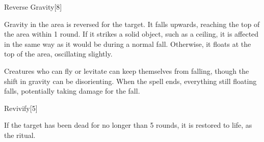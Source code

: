 \begin{spellsection}{Reverse Gravity}[8]
    \begin{spellheader}
    \end{spellheader}
    \begin{spellcontent}
        \begin{spelltargetinginfo}
        \end{spelltargetinginfo}
        \begin{spelleffects}
            \spelleffect Gravity in the area is reversed for the target. It falls upwards, reaching the top of the area within 1 round. If it strikes a solid object, such as a ceiling, it is affected in the same way as it would be during a normal fall. Otherwise, it floats at the top of the area, oscillating slightly.
            \spelldur \durshort
        \end{spelleffects}
    \end{spellcontent}
    \begin{spellfooter}
        \spellnotes Creatures who can fly or levitate can keep themselves from falling, though the shift in gravity can be disorienting. When the spell ends, everything still floating falls, potentially taking damage for the fall.
        \miscastyou
    \end{spellfooter}
\end{spellsection}

\begin{spellsection}{Revivify}[5]
    \begin{spellheader}
    \end{spellheader}
    \begin{spellcontent}
        \begin{spelltargetinginfo}
        \end{spelltargetinginfo}
        \begin{spelleffects}
            \spelleffect If the target has been dead for no longer than 5 rounds, it is restored to life, as the  ritual.
        \end{spelleffects}
    \end{spellcontent}
    \begin{spellfooter}
        \miscastexplode
    \end{spellfooter}
    \begin{spellaugments}
    \end{spellaugments}
\end{spellsection}

